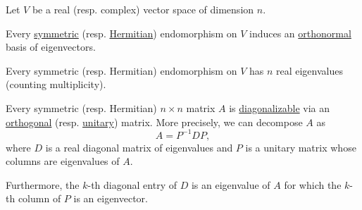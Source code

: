 \begin{theorem}\label{thm:spectral_theorem}
  Let \( V \) be a real (resp. complex) vector space of dimension \( n \).

  \begin{thmenum}
     Every \hyperref[def:transpose_matrix]{symmetric} (resp. \hyperref[def:conjugate_transpose]{Hermitian}) endomorphism on \( V \) induces an \hyperref[def:orthogonality]{orthonormal} basis of eigenvectors.

     Every symmetric (resp. Hermitian) endomorphism on \( V \) has \( n \) real eigenvalues (counting multiplicity).

     Every symmetric (resp. Hermitian) \( n \times n \) matrix \( A \) is \hyperref[def:diagonalizable_matrix]{diagonalizable} via an \hyperref[def:unitary_matrix]{orthogonal} (resp. \hyperref[def:unitary_matrix]{unitary}) matrix. More precisely, we can decompose \( A \) as
    \begin{equation*}
      A = P^{-1} D P,
    \end{equation*}
    where \( D \) is a real diagonal matrix of eigenvalues and \( P \) is a unitary matrix whose columns are eigenvalues of \( A \).

    Furthermore, the \( k \)-th diagonal entry of \( D \) is an eigenvalue of \( A \) for which the \( k \)-th column of \( P \) is an eigenvector.
  \end{thmenum}
\end{theorem}
